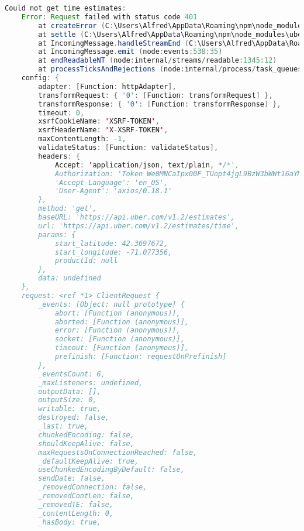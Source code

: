 \begin{lstlisting}[language=Java, caption=Pesan Error Perkakas \textit{Uber CLI}]
Could not get time estimates:
    Error: Request failed with status code 401
        at createError (C:\Users\Alfred\AppData\Roaming\npm\node_modules\uber-cli\node_modules\axios\lib\core\createError.js:16:15)
        at settle (C:\Users\Alfred\AppData\Roaming\npm\node_modules\uber-cli\node_modules\axios\lib\core\settle.js:18:12)
        at IncomingMessage.handleStreamEnd (C:\Users\Alfred\AppData\Roaming\npm\node_modules\uber-cli\node_modules\axios\lib\adapters\http.js:202:11)
        at IncomingMessage.emit (node:events:538:35)
        at endReadableNT (node:internal/streams/readable:1345:12)
        at processTicksAndRejections (node:internal/process/task_queues:83:21) {
    config: {
        adapter: [Function: httpAdapter],
        transformRequest: { '0': [Function: transformRequest] },
        transformResponse: { '0': [Function: transformResponse] },
        timeout: 0,
        xsrfCookieName: 'XSRF-TOKEN',
        xsrfHeaderName: 'X-XSRF-TOKEN',
        maxContentLength: -1,
        validateStatus: [Function: validateStatus],
        headers: {
            Accept: 'application/json, text/plain, */*',
            Authorization: 'Token We0MNCaIpx00F_TUopt4jgL9BzW3bWWt16aYM4mh',
            'Accept-Language': 'en_US',
            'User-Agent': 'axios/0.18.1'
        },
        method: 'get',
        baseURL: 'https://api.uber.com/v1.2/estimates',
        url: 'https://api.uber.com/v1.2/estimates/time',
        params: {
            start_latitude: 42.3697672,
            start_longitude: -71.077356,
            productId: null
        },
        data: undefined
    },
    request: <ref *1> ClientRequest {
        _events: [Object: null prototype] {
            abort: [Function (anonymous)],
            aborted: [Function (anonymous)],
            error: [Function (anonymous)],
            socket: [Function (anonymous)],
            timeout: [Function (anonymous)],
            prefinish: [Function: requestOnPrefinish]
        },
        _eventsCount: 6,
        _maxListeners: undefined,
        outputData: [],
        outputSize: 0,
        writable: true,
        destroyed: false,
        _last: true,
        chunkedEncoding: false,
        shouldKeepAlive: false,
        maxRequestsOnConnectionReached: false,
        _defaultKeepAlive: true,
        useChunkedEncodingByDefault: false,
        sendDate: false,
        _removedConnection: false,
        _removedContLen: false,
        _removedTE: false,
        _contentLength: 0,
        _hasBody: true,

\end{lstlisting}
